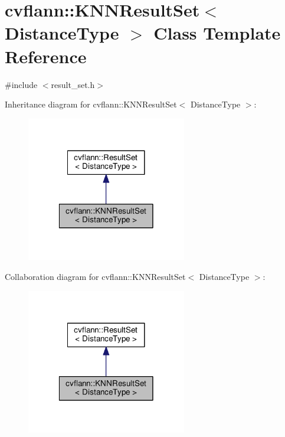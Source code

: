 \hypertarget{classcvflann_1_1KNNResultSet}{\section{cvflann\-:\-:K\-N\-N\-Result\-Set$<$ Distance\-Type $>$ Class Template Reference}
\label{classcvflann_1_1KNNResultSet}
}


{\ttfamily \#include $<$result\-\_\-set.\-h$>$}



Inheritance diagram for cvflann\-:\-:K\-N\-N\-Result\-Set$<$ Distance\-Type $>$\-:\nopagebreak
\begin{figure}[H]
\begin{center}
\leavevmode
\includegraphics[width=198pt]{classcvflann_1_1KNNResultSet__inherit__graph}
\end{center}
\end{figure}


Collaboration diagram for cvflann\-:\-:K\-N\-N\-Result\-Set$<$ Distance\-Type $>$\-:\nopagebreak
\begin{figure}[H]
\begin{center}
\leavevmode
\includegraphics[width=198pt]{classcvflann_1_1KNNResultSet__coll__graph}
\end{center}
\end{figure}

